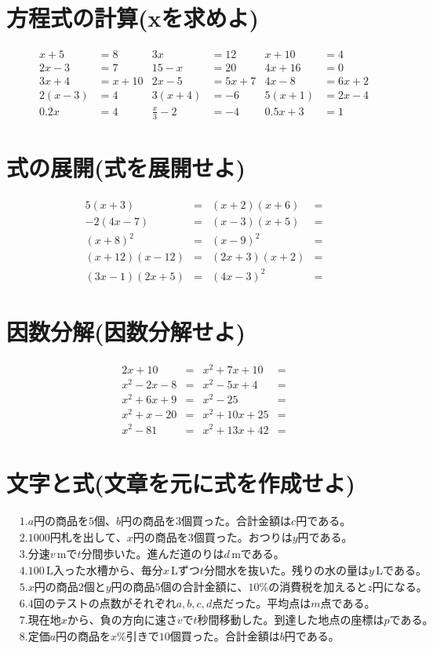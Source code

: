 \documentclass[paper=b4j,landscape,twocolumn,fleqn]{jlreq}
\begin{document}
\section{方程式の計算(xを求めよ)}
\begin{align*}
    x + 5 &= 8 & 3x &= 12 & x + 10 &= 4 \\
    2x - 3 &= 7 & 15 - x &= 20 & 4x + 16 &= 0 \\
    3x + 4 &= x + 10 & 2x - 5 &= 5x + 7 & 4x - 8 &= 6x + 2 \\
    2(x - 3) &= 4 & 3(x + 4) &= -6 & 5(x + 1) &= 2x - 4 \\
    0.2x &= 4 & \frac{x}{3} - 2 &= -4 & 0.5x + 3 &= 1 
\end{align*}
\section{式の展開(式を展開せよ)}
\begin{align*}
    5(x+3) &= & (x+2)(x+6) &= \\
    -2(4x-7) &= & (x-3)(x+5) &= \\
    (x+8)^2 &= & (x-9)^2 &= \\
    (x+12)(x-12) &= & (2x+3)(x+2) &= \\
    (3x-1)(2x+5) &= & (4x-3)^2 &= 
\end{align*}
\section{因数分解(因数分解せよ)}
\begin{align*}
    2x+10 &= & x^2+7x+10 &= \\
    x^2-2x-8 &= & x^2-5x+4 &= \\
    x^2+6x+9 &= & x^2-25 &= \\
    x^2+x-20 &= & x^2+10x+25 &= \\
    x^2-81 &= & x^2+13x+42 &= 
\end{align*}
\section{文字と式(文章を元に式を作成せよ)}
\begin{align*}
　&1.　a円の商品を5個、b円の商品を3個買った。合計金額はc円である。\\
　&2.　1000円札を出して、x円の商品を3個買った。おつりはy円である。\\
　&3.　分速v\,\text{m}でt分間歩いた。進んだ道のりはd\,\text{m}である。\\
　&4.　100\,\text{L}入った水槽から、毎分x\,\text{L}ずつt分間水を抜いた。残りの水の量はy\,\text{L}である。\\
　&5.　x円の商品2個とy円の商品5個の合計金額に、10\%の消費税を加えるとz円になる。\\
　&6.　4回のテストの点数がそれぞれa, b, c, d点だった。平均点はm点である。\\
　&7.　現在地xから、負の方向に速さvでt秒間移動した。到達した地点の座標はpである。\\
　&8.　定価a円の商品をx\%引きで10個買った。合計金額はb円である。
\end{align*}
\end{document}

